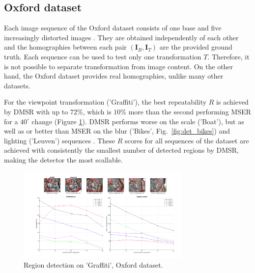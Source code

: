 \documentclass[conference,compsoc]{IEEEtran}
\def\I{{\mathbf I}}
\begin{document}
\subsection{Oxford dataset}
\label{ssec:oxford}
Each image sequence of the Oxford dataset consists of one base and five increasingly distorted images \cite{Mikolajczyk:2005}. They are obtained independently of each other and the homographies between each pair $(\I_B,\I_T)$ are the provided  ground truth. Each sequence can be used to test only one transformation $T$. Therefore, it is not possible to separate transformation from image content. On the other hand, the Oxford dataset provides real homographies, unlike many other datasets.

For the viewpoint transformation ('Graffiti'), the best repeatability $R$ is achieved by DMSR with up to $72\%$, which is $10\%$ more than the second performing MSER for a $40^{\circ}$ change (Figure \ref{fig:det_graffiti}). DMSR performs worse on the scale ('Boat'), but as well as or better than MSER on the blur ('Bikes', Fig.~\ref{fig:det_bikes}) and lighting ('Leuven') sequences \cite{elena_ranguelova_2016_45156}. These $R$ scores for all sequences of the dataset are achieved with consistently the smallest number of detected regions by DMSR, making the detector the most scallable.  
\begin{figure}[htb]
\centering
\begin{minipage}[b]{.99\linewidth}
  \centering
  \centerline{\includegraphics[width=8.5cm]{repeatability_all_affine_graffiti_viewpoint}}
\end{minipage}
\hfill
\caption{Region detection on 'Graffiti', Oxford dataset.}
\label{fig:det_graffiti}
%
\end{figure}
\end{document}
